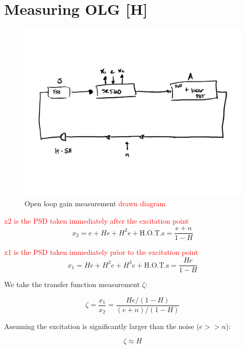 \section{Measuring OLG [H]}

\begin{figure}[H]
  \begin{center}
    \includegraphics[width=.5\textwidth]{figs/ALGAAS/Loop_gain_measurement_drawn_diagram.pdf}
    \caption{Open loop gain measurement \textcolor{red}{drawn diagram}}
  \end{center}
  \label{fig:OLGmath}
\end{figure}

\textcolor{red}{x2 is the PSD taken immediately after the excitation point}
\begin{equation}
x_2 = e + He + H^2 e + \mathrm{H.O.T.s} = \frac{e + n}{1-H}
\end{equation}

\textcolor{red}{x1 is the PSD taken immediately prior to the excitation point}
\begin{equation}
x_1 = He + H^2e + H^3e + \mathrm{H.O.T.s}  = \frac{He}{1-H}
\end{equation}

We take the transfer function measurement $\zeta$:

\begin{equation}
\zeta = \frac{x_1}{x_2} = \frac{He/(1-H)}{(e+n)/(1-H)}
\end{equation}

Assuming the excitation is significantly larger than the noise ($e>>n$):

\begin{equation}
\zeta \approx H
\end{equation}
